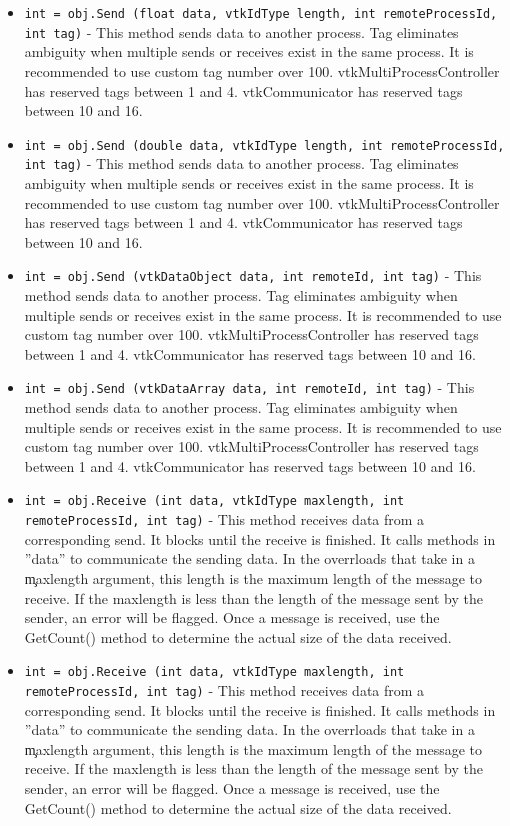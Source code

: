 \begin{itemize}
\item  \verb|int = obj.Send (float data, vtkIdType length, int remoteProcessId, int tag)| -  This method sends data to another process.  Tag eliminates ambiguity
 when multiple sends or receives exist in the same process.
 It is recommended to use custom tag number over 100.
 vtkMultiProcessController has reserved tags between 1 and 4.
 vtkCommunicator has reserved tags between 10 and 16.

\item  \verb|int = obj.Send (double data, vtkIdType length, int remoteProcessId, int tag)| -  This method sends data to another process.  Tag eliminates ambiguity
 when multiple sends or receives exist in the same process.
 It is recommended to use custom tag number over 100.
 vtkMultiProcessController has reserved tags between 1 and 4.
 vtkCommunicator has reserved tags between 10 and 16.

\item  \verb|int = obj.Send (vtkDataObject data, int remoteId, int tag)| -  This method sends data to another process.  Tag eliminates ambiguity
 when multiple sends or receives exist in the same process.
 It is recommended to use custom tag number over 100.
 vtkMultiProcessController has reserved tags between 1 and 4.
 vtkCommunicator has reserved tags between 10 and 16.

\item  \verb|int = obj.Send (vtkDataArray data, int remoteId, int tag)| -  This method sends data to another process.  Tag eliminates ambiguity
 when multiple sends or receives exist in the same process.
 It is recommended to use custom tag number over 100.
 vtkMultiProcessController has reserved tags between 1 and 4.
 vtkCommunicator has reserved tags between 10 and 16.

\item  \verb|int = obj.Receive (int data, vtkIdType maxlength, int remoteProcessId, int tag)| -  This method receives data from a corresponding send. It blocks
 until the receive is finished.  It calls methods in ''data''
 to communicate the sending data. In the overrloads that take in a \c
 maxlength argument, this length is the maximum length of the message to
 receive. If the maxlength is less than the length of the message sent by
 the sender, an error will be flagged. Once a message is received, use the
 GetCount() method to determine the actual size of the data received.

\item  \verb|int = obj.Receive (int data, vtkIdType maxlength, int remoteProcessId, int tag)| -  This method receives data from a corresponding send. It blocks
 until the receive is finished.  It calls methods in ''data''
 to communicate the sending data. In the overrloads that take in a \c
 maxlength argument, this length is the maximum length of the message to
 receive. If the maxlength is less than the length of the message sent by
 the sender, an error will be flagged. Once a message is received, use the
 GetCount() method to determine the actual size of the data received.


\end{itemize}

